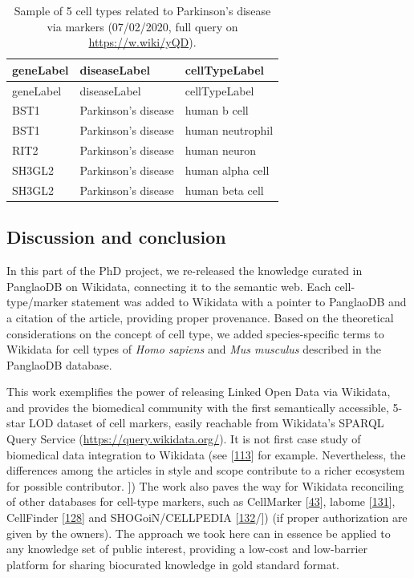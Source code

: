 \begin{longtable}[]{@{}lll@{}}
\caption{Sample of 5 cell types related to Parkinson's disease via markers (07/02/2020, full query on \url{https://w.wiki/yQD}).
\label{tbl:parkinson}}\tabularnewline
\toprule
geneLabel & diseaseLabel & cellTypeLabel \\
\midrule
\endfirsthead
\toprule
geneLabel & diseaseLabel & cellTypeLabel \\
\midrule
\endhead
BST1 & Parkinson's disease & human b cell \\
BST1 & Parkinson's disease & human neutrophil \\
RIT2 & Parkinson's disease & human neuron \\
SH3GL2 & Parkinson's disease & human alpha cell \\
SH3GL2 & Parkinson's disease & human beta cell \\
\bottomrule
\end{longtable}

\hypertarget{discussion-and-conclusion}{%
\subsection{Discussion and conclusion}\label{discussion-and-conclusion}}

In this part of the PhD project, we re-released the knowledge curated in PanglaoDB on Wikidata, connecting it to the semantic web.
Each cell-type/marker statement was added to Wikidata with a pointer to PanglaoDB and a citation of the article, providing proper provenance.
Based on the theoretical considerations on the concept of cell type, we added species-specific terms to Wikidata for cell types of \emph{Homo sapiens} and \emph{Mus musculus} described in the PanglaoDB database.

This work exemplifies the power of releasing Linked Open Data via Wikidata, and provides the biomedical community with the first semantically accessible, 5-star LOD dataset of cell markers, easily reachable from Wikidata's SPARQL Query Service (\url{https://query.wikidata.org/}).
It is not first case study of biomedical data integration to Wikidata (see {[}\protect\hyperlink{ref-mPoPwN77}{113}{]} for example.
Nevertheless, the differences among the articles in style and scope contribute to a richer ecosystem for possible contributor.
{]})
The work also paves the way for Wikidata reconciling of other databases for cell-type markers, such as CellMarker {[}\protect\hyperlink{ref-chGii6yw}{43}{]}, labome {[}\protect\hyperlink{ref-rhRRCtlA}{131}{]}, CellFinder {[}\protect\hyperlink{ref-4AEy2xhQ}{128}{]} and SHOGoiN/CELLPEDIA {[}\protect\hyperlink{ref-6uWWsiSq}{132}/{]}) (if proper authorization are given by the owners).
The approach we took here can in essence be applied to any knowledge set of public interest, providing a low-cost and low-barrier platform for sharing biocurated knowledge in gold standard format.

